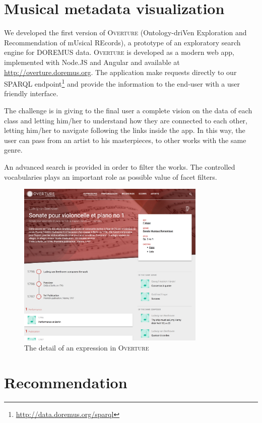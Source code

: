 \documentclass[a4paper,11pt]{report}
\begin{document}
\section{Musical metadata visualization} \label{visualisation}

We developed the first version of \textsc{Overture} (Ontology-driVen Exploration and Recommendation of mUsical REcords), a prototype of an exploratory search engine for DOREMUS data. \textsc{Overture} is developed as a modern web app, implemented with Node.JS and Angular and available at \url{http://overture.doremus.org}. The application make requests directly to our SPARQL endpoint\footnote{\url{http://data.doremus.org/sparql}} and provide the information to the end-user with a user friendly interface.

The challenge is in giving to the final user a complete vision on the data of each class and letting him/her to understand how they are connected to each other, letting him/her to navigate following the links inside the app. In this way, the user can pass from an artist to his masterpieces, to other works with the same genre.

An advanced search is provided in order to filter the works. The controlled vocabularies plays an important role as possible value of facet filters.

\begin{figure}
 \centerline{
 \includegraphics[width=9cm]{overture-sonate-cello.png}}
 \caption{The detail of an expression in \textsc{Overture}}
 \label{fig:overture-detail}
\end{figure}

\section{Recommendation} \label{recommendation}
\end{document}
